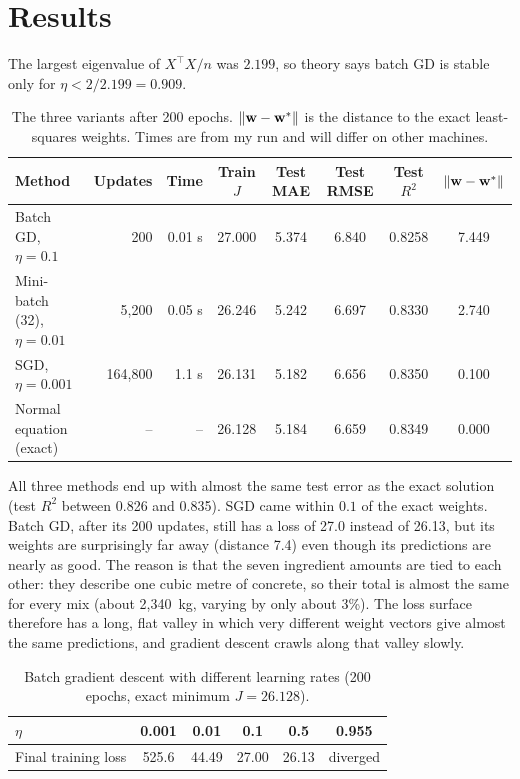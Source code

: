 \section{Results}

The largest eigenvalue of $X^\top X/n$ was $2.199$, so theory says batch GD is stable only for
$\eta<2/2.199=0.909$.

\begin{table}[H]
\centering\footnotesize\setlength{\tabcolsep}{4.5pt}
\caption{The three variants after 200 epochs. $\|\vect w-\vect w^*\|$ is the distance to the exact
least-squares weights. Times are from my run and will differ on other machines.}
\label{tab:gd-variants}
\begin{tabular}{@{}l r r S[table-format=2.3] S[table-format=1.3] S[table-format=1.3] S[table-format=1.4] S[table-format=1.3]@{}}
\toprule
\textbf{Method} & \textbf{Updates} & \textbf{Time} & {\textbf{Train $J$}} & {\textbf{Test MAE}} & {\textbf{Test RMSE}} & {\textbf{Test $R^2$}} & {$\|\vect w-\vect w^*\|$}\\
\midrule
Batch GD, $\eta=0.1$          & 200     & 0.01 s & 27.000 & 5.374 & 6.840 & 0.8258 & 7.449\\
Mini-batch (32), $\eta=0.01$  & 5,200   & 0.05 s & 26.246 & 5.242 & 6.697 & 0.8330 & 2.740\\
SGD, $\eta=0.001$             & 164,800 & 1.1 s  & 26.131 & 5.182 & 6.656 & 0.8350 & 0.100\\
\midrule
Normal equation (exact)       & --      & --     & 26.128 & 5.184 & 6.659 & 0.8349 & 0.000\\
\bottomrule
\end{tabular}
\end{table}

All three methods end up with almost the same test error as the exact solution (test $R^2$ between 0.826
and 0.835). SGD came within $0.1$ of the exact weights. Batch GD, after its 200 updates, still has a
loss of 27.0 instead of 26.13, but its weights are surprisingly far away (distance 7.4) even though its
predictions are nearly as good. The reason is that the seven ingredient amounts are tied to each other: they
describe one cubic metre of concrete, so their total is almost the same for every mix (about
2,340~kg, varying by only about 3\%). The loss surface therefore has a long, flat
valley in which very different weight vectors give almost the same predictions, and gradient descent
crawls along that valley slowly.

\begin{table}[H]
\centering\small
\caption{Batch gradient descent with different learning rates (200 epochs, exact minimum $J=26.128$).}
\label{tab:gd-lr}
\begin{tabular}{@{}l c c c c c@{}}
\toprule
$\eta$ & 0.001 & 0.01 & 0.1 & 0.5 & 0.955 \\
\midrule
Final training loss & 525.6 & 44.49 & 27.00 & 26.13 & diverged \\
\bottomrule
\end{tabular}
\end{table}

